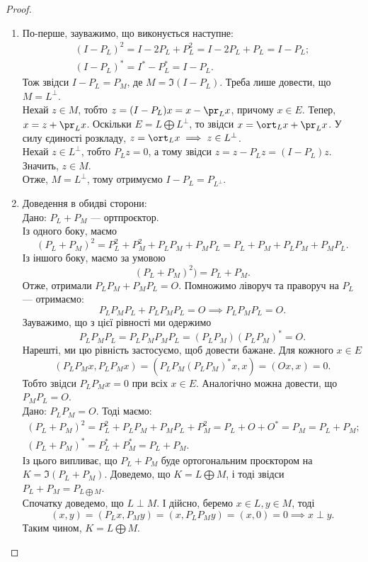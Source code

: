 \documentclass{math_library}
\begin{document}
\begin{proof}
\begin{enumerate}[topsep=0pt,wide=0pt,label={\arabic*)}]
\item По-перше, зауважимо, що виконується наступне:
\begin{align*}
(I - P_L)^2 = I - 2P_L + P_L^2 = I - 2P_L + P_L = I - P_L; \\
(I - P_L)^* = I^* - P_L^* = I - P_L.
\end{align*}
Тож звідси $I - P_L = P_M$, де $M = \Im (I-P_L)$. Треба лише довести, що $M = L^\perp$.\\
Нехай $z \in M$, тобто $z = (I-P_L)x = x - \pr_L x$, причому $x \in E$. Тепер, $x = z + \pr_L x$. Оскільки $E = L \bigoplus L^{\perp}$, то звідси $x = \ort_L x + \pr_L x$. У силу єдиності розкладу, $z = \ort_L x \implies z \in L^\perp$.\\
Нехай $z \in L^\perp$, тобто $P_L z = 0$, а тому звідси $z = z - P_L z = (I-P_L)z$. Значить, $z \in M$.\\
Отже, $M = L^\perp$, тому отримуємо $I - P_L = P_{L^\perp}$.

\item Доведення в обидві сторони:\\
\rightproof Дано: $P_L + P_M$ --- ортпроєктор.\\
Із одного боку, маємо 
\[
(P_L + P_M)^2 = P_L^2 + P_M^2 + P_L P_M + P_M P_L = P_L + P_M + P_L P_M + P_M P_L.
\]
Із іншого боку, маємо за умовою 
\[
(P_L + P_M)^2) = P_L + P_M.
\]
Отже, отримали $P_L P_M + P_M P_L = O$. Помножимо ліворуч та праворуч на $P_L$ --- отримаємо:
\[
P_L P_M P_L + P_L P_M P_L = O \implies P_L P_M P_L = O.
\]
Зауважимо, що з цієї рівності ми одержимо
\[
P_L P_M P_L = P_L P_M P_M P_L = (P_L P_M) (P_L P_M)^* = O.
\]
Нарешті, ми цю рівність застосуємо, щоб довести бажане. Для кожного $x \in E$
\[
(P_L P_M x, P_L P_M x) = (P_L P_M (P_L P_M)^* x, x) = (Ox,x) = 0.
\]
Тобто звідси $P_LP_M x = 0$ при всіх $x \in E$. Аналогічно можна довести, що $P_M P_L = O$.
\bigskip \\
\leftproof Дано: $P_LP_M = O$. Тоді маємо:
\begin{align*}
(P_L + P_M)^2 = P_L^2 + P_L P_M + P_M P_L + P_M^2 = P_L + O + O^* = P_M = P_L + P_M; \\
(P_L + P_M)^* = P_L^* + P_M^* = P_L + P_M.
\end{align*}
Із цього випливає, що $P_L + P_M$ буде ортогональним проєктором на $K =\Im(P_L+P_M)$. Доведемо, що $K = L \bigoplus M$, і тоді звідси $P_L + P_M = P_{L \bigoplus M}$.\\
Спочатку доведемо, що $L \perp M$. І дійсно, беремо $x \in L, y \in M$, тоді
\[
(x,y) = (P_L x, P_M y) = (x, P_L P_M y) = (x,0) = 0 \implies x \perp y.
\]
Таким чином, $K = L \bigoplus M$.


\end{enumerate}
\end{proof}
\end{document}
